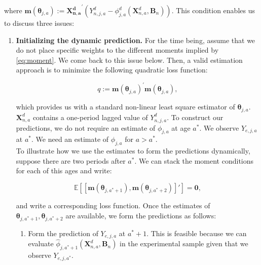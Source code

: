 \noindent where $\bm{m} \left( \bm{\theta}_{j,a} \right) := {\bm{X_{n,a}^d}}^{'} \left( Y_{n,j,a}^d -   \phi^d_{j,a} \left( \bm{X}_{n,a}^d, \bm{B}_{n} \right) \right)$. This condition enables us to discuss three issues: 

\begin{enumerate}
\item \textbf{Initializing the dynamic prediction.} 
\noindent For the time being, assume that we do not place specific weights to the different moments implied by \eqref{eq:moment}. We come back to this issue below. Then, a valid estimation approach is to minimize the following quadratic loss function: 

\begin{equation}
q :=  {\bm{m} \left( \bm{\theta}_{j,a} \right)}^{'}{\bm{m} \left( \bm{\theta}_{j,a} \right)}, \label{eq:loss}
\end{equation}

\noindent which provides us with a standard non-linear least square estimator of $\bm{\theta}_{j,a}$.\\

\noindent $\bm{X}_{n,a}^d$ contains a one-period lagged value of $Y_{n,j,a}^d$. To construct our predictions, we do not require an estimate of $\phi_{j,a}$ at age $a^*$. We observe $Y_{e,j,a}$ at $a^*$. We need an estimate of $\phi_{j,a}$ for $a > a^*$.\\ 

\noindent To illustrate how we use the estimates to form the predictions dynamically, suppose there are two periods after $a^*$. We can stack the moment conditions for each of this ages and write: 

\begin{equation}
\mathbb{E} \left[  \left[ \bm{m} \left( \bm{\theta}_{j,a^* + 1}  \right)   , \bm{m} \left( \bm{\theta}_{j,a^* + 2} \right)  \right]'  \right] = \bm{0}, 
\end{equation}

\noindent and write a corresponding loss function. Once the estimates of $\bm{\theta}_{j,a^* + 1}, \bm{\theta}_{j,a^* + 2}$ are available, we form the predictions as follows: 

\begin{enumerate}
\item Form the prediction of $Y_{e,j,a}$ at $a^* + 1$. This is feasible because we can evaluate $ \hat{\phi}_{j,a^*+1}\left( \bm{X}_{n,a}^d, \bm{B}_{n} \right)$ in the experimental sample given that we observe $Y_{e,j,a^*}$.


\end{enumerate}
\end{enumerate}
